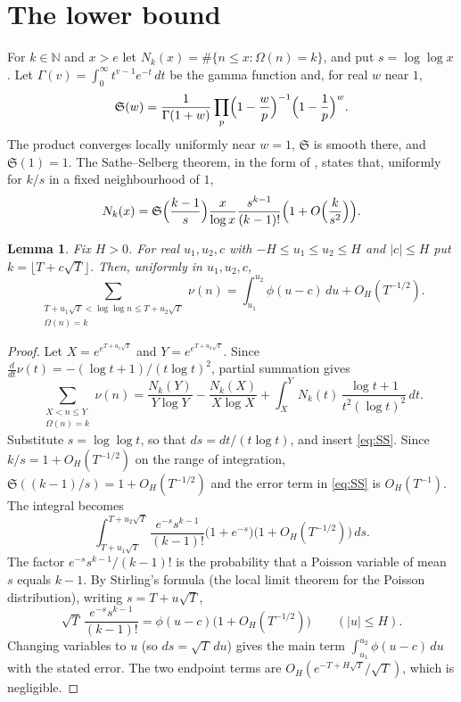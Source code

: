 \documentclass[11pt,a4paper]{article}
\numberwithin{equation}{section}
\theoremstyle{plain}
\newtheorem{lemma}[theorem]{Lemma}
\theoremstyle{definition}
\theoremstyle{remark}
\newcommand{\N}{\mathbb{N}}
\begin{document}
\section{The lower bound}\label{sec:lower}

For $k\in\N$ and $x>e$ let $N_k(x)=\#\{n\le x:\Omega(n)=k\}$, and put $s=\log\log x$. Let $\Gamma(v)=\int_0^\infty t^{v-1}e^{-t}\,dt$ be the gamma function and, for real $w$ near $1$,
\[
\mathfrak S(w)=\frac{1}{\Gamma(1+w)}\prod_p\Bigl(1-\frac wp\Bigr)^{-1}\Bigl(1-\frac1p\Bigr)^{w}.
\]
The product converges locally uniformly near $w=1$, $\mathfrak S$ is smooth there, and $\mathfrak S(1)=1$. The Sathe--Selberg theorem, in the form of \cite[Theorem~2.3]{Lichtman-BM}, states that, uniformly for $k/s$ in a fixed neighbourhood of $1$,
\begin{equation}\label{eq:SS}
N_k(x)=\mathfrak S\Bigl(\frac{k-1}{s}\Bigr)\frac{x}{\log x}\frac{s^{k-1}}{(k-1)!}\Bigl(1+O\Bigl(\frac{k}{s^2}\Bigr)\Bigr).
\end{equation}

\begin{lemma}\label{lem:lower}
Fix $H>0$. For real $u_1,u_2,c$ with $-H\le u_1\le u_2\le H$ and $|c|\le H$ put $k=\lfloor T+c\sqrt T\rfloor$. Then, uniformly in $u_1,u_2,c$,
\[
\sum_{\substack{T+u_1\sqrt T<\log\log n\le T+u_2\sqrt T\\ \Omega(n)=k}}\nu(n)=\int_{u_1}^{u_2}\phi(u-c)\,du+O_H(T^{-1/2}).
\]
\end{lemma}

\begin{proof}
Let $X=e^{e^{T+u_1\sqrt T}}$ and $Y=e^{e^{T+u_2\sqrt T}}$. Since $\frac{d}{dt}\nu(t)=-(\log t+1)/(t\log t)^2$, partial summation gives
\[
\sum_{\substack{X<n\le Y\\ \Omega(n)=k}}\nu(n)=\frac{N_k(Y)}{Y\log Y}-\frac{N_k(X)}{X\log X}+\int_X^YN_k(t)\,\frac{\log t+1}{t^2(\log t)^2}\,dt.
\]
Substitute $s=\log\log t$, so that $ds=dt/(t\log t)$, and insert \eqref{eq:SS}. Since $k/s=1+O_H(T^{-1/2})$ on the range of integration, $\mathfrak S((k-1)/s)=1+O_H(T^{-1/2})$ and the error term in \eqref{eq:SS} is $O_H(T^{-1})$. The integral becomes
\[
\int_{T+u_1\sqrt T}^{T+u_2\sqrt T}\frac{e^{-s}s^{k-1}}{(k-1)!}\bigl(1+e^{-s}\bigr)\bigl(1+O_H(T^{-1/2})\bigr)\,ds.
\]
The factor $e^{-s}s^{k-1}/(k-1)!$ is the probability that a Poisson variable of mean $s$ equals $k-1$. By Stirling's formula (the local limit theorem for the Poisson distribution), writing $s=T+u\sqrt T$,
\[
\sqrt T\,\frac{e^{-s}s^{k-1}}{(k-1)!}=\phi(u-c)\bigl(1+O_H(T^{-1/2})\bigr)\qquad(|u|\le H).
\]
Changing variables to $u$ (so $ds=\sqrt T\,du$) gives the main term $\int_{u_1}^{u_2}\phi(u-c)\,du$ with the stated error. The two endpoint terms are $O_H(e^{-T+H\sqrt T}/\sqrt T)$, which is negligible.
\end{proof}
\end{document}

